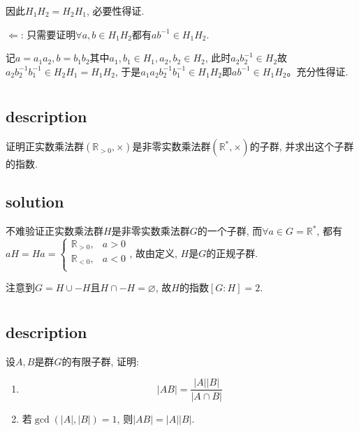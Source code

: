 \documentclass[UTF-8]{ctexart}
\begin{document}
因此$H_1H_2 = H_2H_1$, 必要性得证.

$\Leftarrow$: 只需要证明$\forall a, b \in H_1H_2$都有$ab^{-1} \in H_1H_2$.

记$a = a_1a_2, b = b_1b_2$其中$a_1, b_1 \in H_1, a_2, b_2 \in H_2$, 此时$a_2b_2^{-1} \in H_2$故$a_2b_2^{-1}b_1^{-1} \in H_2H_1 = H_1H_2$, 于是$a_1a_2b_2^{-1}b_1^{-1} \in H_1H_2$即$ab^{-1} \in H_1H_2$。充分性得证.
\section{}
\subsection{description}
证明正实数乘法群$(\mathbb R_{>0}, \times)$是非零实数乘法群$(\mathbb R^*, \times)$的子群, 并求出这个子群的指数.
\subsection{solution}
不难验证正实数乘法群$H$是非零实数乘法群$G$的一个子群, 而$\forall a \in G = \mathbb R^*$, 都有$aH = Ha = \begin{cases}
\mathbb R_{>0}, & a > 0\\
\mathbb R_{<0}, & a < 0\\
\end{cases}$, 故由定义, $H$是$G$的正规子群.

注意到$G = H \cup -H$且$H \cap -H = \varnothing$, 故$H$的指数$[G:H] = 2$.

\section{}
\subsection{description}
设$A, B$是群$G$的有限子群, 证明:
\begin{enumerate}
	\item $$|AB| = \frac{|A||B|}{|A \cap B|}$$
	\item 若$\gcd(|A|, |B|) = 1$, 则$|AB| = |A||B|$.
\end{enumerate}
\end{document}
